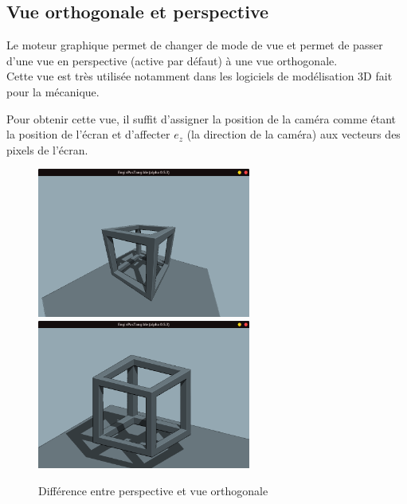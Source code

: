 \subsection{Vue orthogonale et perspective}
Le moteur graphique permet de changer de mode de vue et permet de passer d'une vue en perspective (active par défaut) à une vue orthogonale.\\
Cette vue est très utilisée notamment dans les logiciels de modélisation 3D fait pour la mécanique.\\
\par
Pour obtenir cette vue, il suffit d'assigner la position de la caméra comme étant la position de l'écran et d'affecter $e_z$ (la direction de la caméra) aux vecteurs des pixels de l'écran.
\begin{figure}[h]
    \centering
    \includegraphics[width=7cm]{images/screens/orthoff.png}
    \includegraphics[width=7cm]{images/screens/orthon.png}
    \caption{Différence entre perspective et vue orthogonale}
    \label{fig:orthoview}
\end{figure}